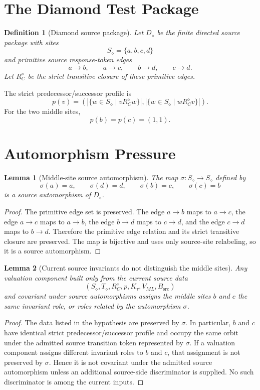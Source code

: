 \documentclass[11pt]{article}
\newcommand{\Diamond}{D_{\diamond}}
\newtheorem{definition}{Definition}
\newtheorem{lemma}{Lemma}
\begin{document}
\section{The Diamond Test Package}

\begin{definition}[Diamond source package]
Let \(\Diamond\) be the finite directed source package with sites
\[
S_{\diamond}=\{a,b,c,d\}
\]
and primitive source response-token edges
\[
a\to b,\qquad a\to c,\qquad b\to d,\qquad c\to d.
\]
Let \(R_C^{\diamond}\) be the strict transitive closure of these primitive
edges.
\end{definition}

The strict predecessor/successor profile is
\[
p(v)=
\left(
|\{w\in S_{\diamond}\mid vR_C^{\diamond}w\}|,
|\{w\in S_{\diamond}\mid wR_C^{\diamond}v\}|
\right).
\]
For the two middle sites,
\[
p(b)=p(c)=(1,1).
\]

\section{Automorphism Pressure}

\begin{lemma}[Middle-site source automorphism]
The map \(\sigma:S_{\diamond}\to S_{\diamond}\) defined by
\[
\sigma(a)=a,\qquad \sigma(d)=d,\qquad \sigma(b)=c,\qquad \sigma(c)=b
\]
is a source automorphism of \(\Diamond\).
\end{lemma}

\begin{proof}
The primitive edge set is preserved. The edge \(a\to b\) maps to \(a\to c\),
the edge \(a\to c\) maps to \(a\to b\), the edge \(b\to d\) maps to \(c\to d\),
and the edge \(c\to d\) maps to \(b\to d\). Therefore the primitive edge
relation and its strict transitive closure are preserved. The map is bijective
and uses only source-site relabeling, so it is a source automorphism.
\end{proof}

\begin{lemma}[Current source invariants do not distinguish the middle sites]
Any valuation component built only from the current source data
\[
(S_{\diamond},T_{\diamond},R_C^{\diamond},p,K_{\tau},V_{ML},B_{\mathrm{src}})
\]
and covariant under source automorphisms assigns the middle sites \(b\) and
\(c\) the same invariant role, or roles related by the automorphism \(\sigma\).
\end{lemma}

\begin{proof}
The data listed in the hypothesis are preserved by \(\sigma\). In particular,
\(b\) and \(c\) have identical strict predecessor/successor profile and occupy
the same orbit under the admitted source transition token represented by
\(\sigma\). If a valuation component assigns different invariant roles to
\(b\) and \(c\), that assignment is not preserved by \(\sigma\). Hence it is
not covariant under the admitted source automorphism unless an additional
source-side discriminator is supplied. No such discriminator is among the
current inputs.
\end{proof}
\end{document}
